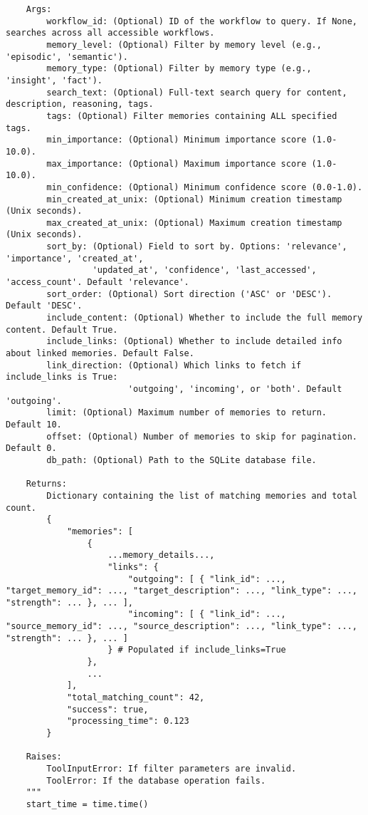 \documentclass[12pt,a4paper]{article}
\begin{document}
\begin{pageablecode}
\begin{verbatim}
    Args:
        workflow_id: (Optional) ID of the workflow to query. If None, searches across all accessible workflows.
        memory_level: (Optional) Filter by memory level (e.g., 'episodic', 'semantic').
        memory_type: (Optional) Filter by memory type (e.g., 'insight', 'fact').
        search_text: (Optional) Full-text search query for content, description, reasoning, tags.
        tags: (Optional) Filter memories containing ALL specified tags.
        min_importance: (Optional) Minimum importance score (1.0-10.0).
        max_importance: (Optional) Maximum importance score (1.0-10.0).
        min_confidence: (Optional) Minimum confidence score (0.0-1.0).
        min_created_at_unix: (Optional) Minimum creation timestamp (Unix seconds).
        max_created_at_unix: (Optional) Maximum creation timestamp (Unix seconds).
        sort_by: (Optional) Field to sort by. Options: 'relevance', 'importance', 'created_at',
                 'updated_at', 'confidence', 'last_accessed', 'access_count'. Default 'relevance'.
        sort_order: (Optional) Sort direction ('ASC' or 'DESC'). Default 'DESC'.
        include_content: (Optional) Whether to include the full memory content. Default True.
        include_links: (Optional) Whether to include detailed info about linked memories. Default False.
        link_direction: (Optional) Which links to fetch if include_links is True:
                        'outgoing', 'incoming', or 'both'. Default 'outgoing'.
        limit: (Optional) Maximum number of memories to return. Default 10.
        offset: (Optional) Number of memories to skip for pagination. Default 0.
        db_path: (Optional) Path to the SQLite database file.

    Returns:
        Dictionary containing the list of matching memories and total count.
        {
            "memories": [
                {
                    ...memory_details...,
                    "links": {
                        "outgoing": [ { "link_id": ..., "target_memory_id": ..., "target_description": ..., "link_type": ..., "strength": ... }, ... ],
                        "incoming": [ { "link_id": ..., "source_memory_id": ..., "source_description": ..., "link_type": ..., "strength": ... }, ... ]
                    } # Populated if include_links=True
                },
                ...
            ],
            "total_matching_count": 42,
            "success": true,
            "processing_time": 0.123
        }

    Raises:
        ToolInputError: If filter parameters are invalid.
        ToolError: If the database operation fails.
    """
    start_time = time.time()


\end{verbatim}
\end{pageablecode}
\end{document}
